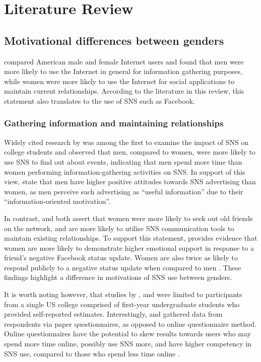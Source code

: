\section{Literature Review}

\subsection{Motivational differences between genders}

\citet{Fallows2005} compared American male and female Internet users and found that men were more likely to use the Internet in general for information gathering purposes, while women were more likely to use the Internet for social applications to maintain current relationships. According to the literature in this review, this statement also translates to the use of SNS such as Facebook.

\subsubsection{Gathering information and maintaining relationships}

Widely cited research by \citet{Raacke2008} was among the first to examine the impact of SNS on college students and observed that men, compared to women, were more likely to use SNS to find out about events, indicating that men spend more time than women performing information-gathering activities on SNS. In support of this view, \citet[p. 2]{Choi2014} state that men have higher positive attitudes towards SNS advertising than women, as men perceive such advertising as ``useful information'' due to their ``information-oriented motivation''.

In contrast, \citet{Mazman2011} and \citet{Muscanell2012} both assert that women were more likely to seek out old friends on the network, and are more likely to utilise SNS communication tools to maintain existing relationships. To support this statement, \citet{Joiner2014} provides evidence that women are more likely to demonstrate higher emotional support in response to a friend's negative Facebook status update. Women are also twice as likely to respond publicly to a negative status update when compared to men \citep[p. 167]{Joiner2014}. These findings highlight a difference in motivations of SNS use between genders. 

It is worth noting however, that studies by \citet{Raacke2008}, \citet{Muscanell2012} and \citet{Joiner2014} were limited to participants from a single US college comprised of first-year undergraduate students who provided self-reported estimates. Interestingly, \citet{Raacke2008} and \citet{Joiner2014} gathered data from respondents via paper questionnaires, as opposed to  online questionnaire method. Online questionnaires have the potential to skew results towards users who may spend more time online, possibly use SNS more, and have higher competency in SNS use, compared to those who spend less time online \citep[p. 280]{Hargittai2007}.

